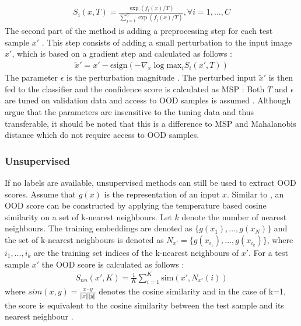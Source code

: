 \begin{align}
	S_i(x,T) = \frac{\exp(f_i(x)/T)}{\sum_{j=1}^{C}\exp(f_j(x)/T)}, \forall i=1,\dots,C
\end{align}
The second part of the method is adding a preprocessing step for each test sample $x'$ \citep{Liang2018}.
This step consists of adding a small perturbation to the input image $x'$, which is based on a gradient step and calculated as follows \citep{Liang2018}:
\begin{align}
	\tilde{x}' = x' - \epsilon \text{sign}(-\nabla_x \log \text{max}_i  S_i(x',T))
\end{align}
The parameter $\epsilon$ is the perturbation magnitude \citep{Liang2018}.
The perturbed input $\tilde{x}'$ is then fed to the classifier and the confidence score is calculated as MSP \citep{Liang2018}:
Both $T$ and $\epsilon$ are tuned on validation data and access to OOD samples is assumed \citep{Liang2018,Hsu2020}.
Although \citep{Liang2018} argue that the parameters are insensitive to the tuning data and thus transferable, it should be noted that this is a difference to MSP and Mahalanobis distance which do not require access to OOD samples.
\subsubsection*{Unsupervised}
If no labels are available, unsupervised methods can still be used to extract OOD scores.
Assume that $g(x)$ is the representation of an input $x$.
Similar to \citep{Michels2023,Sun2022}, an OOD score can be constructed by applying the temperature based cosine similarity on a set of k-nearest neighbours.
Let $k$ denote the number of nearest neighbours.
The training embeddings are denoted as $\{g(x_1),\dots,g(x_N)\}$ and the set of k-nearest neighbours is denoted as $N_{x'} = \{g(x_{i_1}),\dots,g(x_{i_k})\}$, where $i_1,\dots,i_k$ are the training set indices of the k-nearest neighbours of $x'$.
For a test sample $x'$ the OOD score is calculated as follows \citep{Michels2023,Sun2022}:
\begin{align}
	S_{nn}(x',K) = \frac{1}{K}\sum_{i=1}^K \text{sim}(x',N_{x'}(i))
	\label{equation:knn-score}
\end{align}
where $sim(x,y) = \frac{x\cdot y}{\Vert x \Vert \Vert y \Vert}$ denotes the cosine similarity and in the case of k=1, the score is equivalent to the cosine similarity between the test sample and its nearest neighbour \citep{Michels2023}.
